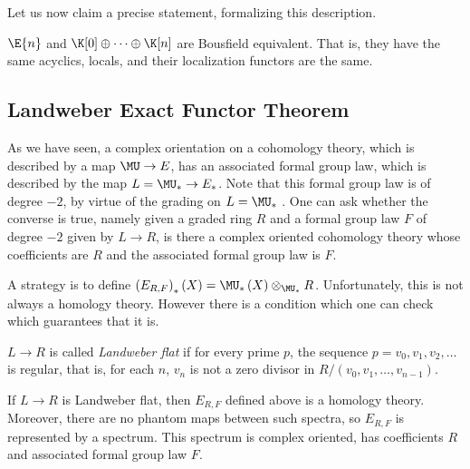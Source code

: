 Let us now claim a precise statement, formalizing this description.

\begin{theorem}
	$\E{n}$ and $\K[0] \oplus \cdots \oplus \K[n]$ are Bousfield equivalent.
	That is, they have the same acyclics, locals, and their localization functors are the same.
\end{theorem}




\subsection{Landweber Exact Functor Theorem}

As we have seen, a complex orientation on a cohomology theory, which is described by a map $\MU \to E$, has an associated formal group law, which is described by the map $L = \MU_* \to E_*$.
Note that this formal group law is of degree $-2$, by virtue of the grading on $L = \MU_*$ .
One can ask whether the converse is true, namely given a graded ring $R$ and a formal group law $F$ of degree $-2$ given by $L \to R$, is there a complex oriented cohomology theory whose coefficients are $R$ and the associated formal group law is $F$.

A strategy is to define $\left(E_{R,F}\right)_*\left(X\right) = \MU_*\left(X\right) \otimes_{\MU_*} R$.
Unfortunately, this is not always a homology theory.
However there is a condition which one can check which guarantees that it is.

\begin{definition}
	$L \to R$ is called \emph{Landweber flat} if for every prime $p$, the sequence $p = v_0, v_1, v_2, \dotsc$ is regular,
	that is, for each $n$, $v_n$ is not a zero divisor in $R/\left(v_0, v_1, \dotsc, v_{n-1}\right)$.
\end{definition}

\begin{theorem}\label{LEFT}
	If $L \to R$ is Landweber flat, then $E_{R,F}$ defined above is a homology theory.
	Moreover, there are no phantom maps between such spectra, so $E_{R,F}$ is represented by a spectrum.
	This spectrum is complex oriented, has coefficients $R$ and associated formal group law $F$.
\end{theorem}


